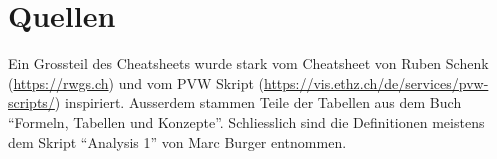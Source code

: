 \documentclass[a4paper,10pt]{article}
\begin{document}
\section{Quellen}
Ein Grossteil des Cheatsheets wurde stark vom Cheatsheet von Ruben Schenk (\href{https://rwgs.ch}{https://rwgs.ch}) und vom PVW Skript (\href{https://vis.ethz.ch/de/services/pvw-scripts/}{https://vis.ethz.ch/de/services/pvw-scripts/}) inspiriert. Ausserdem stammen Teile der Tabellen aus dem Buch ``Formeln, Tabellen und Konzepte''. Schliesslich sind die Definitionen meistens dem Skript ``Analysis 1'' von Marc Burger entnommen.
\end{document}
